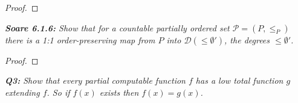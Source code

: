 \documentclass{article}
\begin{document}
\begin{proof}
  \end{proof}

\it \textbf{Soare 6.1.6:} Show that for a countable partially ordered set
  $\mathcal{P}=(P,\leq_P)$ there is a 1:1 order-preserving map from $P$
  into $\mathcal{D}(\leq\emptyset')$, the degrees $\leq\emptyset'$.

  \begin{proof}
  \end{proof}

\it \textbf{Q3:} Show that every partial computable function $f$ has a low
  total function $g$ extending $f$. So if $f(x)$ exists then $f(x)=g(x)$.
\end{document}
